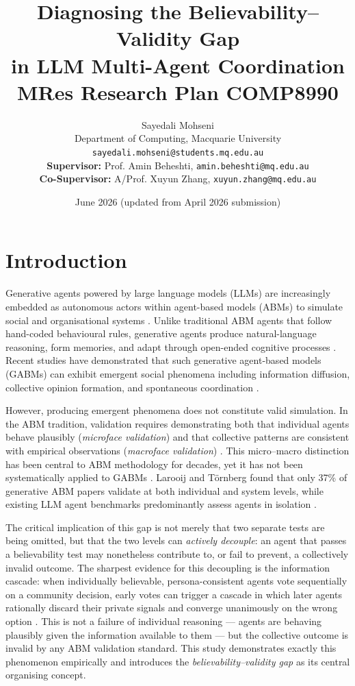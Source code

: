 \documentclass[11pt]{article}
\title{
    Diagnosing the Believability--Validity Gap\\
    in LLM Multi-Agent Coordination\\[0.8em]
    \large MRes Research Plan COMP8990
}
\author{
    Sayedali Mohseni \\
    Department of Computing, Macquarie University \\
    \texttt{sayedali.mohseni@students.mq.edu.au} \\[0.5em]
    \textbf{Supervisor:} Prof. Amin Beheshti, \texttt{amin.beheshti@mq.edu.au} \\
    \textbf{Co-Supervisor:} A/Prof. Xuyun Zhang, \texttt{xuyun.zhang@mq.edu.au}
}
\date{June 2026 (updated from April 2026 submission)}
\begin{document}
\maketitle

\section{Introduction}

Generative agents powered by large language models (LLMs) are increasingly embedded as autonomous actors within agent-based models (ABMs) to simulate social and organisational systems \cite{gao2024survey, ma2024computational}. Unlike traditional ABM agents that follow hand-coded behavioural rules, generative agents produce natural-language reasoning, form memories, and adapt through open-ended cognitive processes \cite{park2023generative}. Recent studies have demonstrated that such generative agent-based models (GABMs) can exhibit emergent social phenomena including information diffusion, collective opinion formation, and spontaneous coordination \cite{park2023generative, ghaffarzadegan2024tutorial}.

However, producing emergent phenomena does not constitute valid simulation. In the ABM tradition, validation requires demonstrating both that individual agents behave plausibly (\emph{microface validation}) and that collective patterns are consistent with empirical observations (\emph{macroface validation}) \cite{windrum2007empirical, moss2005towards}. This micro--macro distinction has been central to ABM methodology for decades, yet it has not been systematically applied to GABMs \cite{sen2025validating, larooij2025critical}. Larooij and T\"{o}rnberg \cite{larooij2025critical} found that only 37\% of generative ABM papers validate at both individual and system levels, while existing LLM agent benchmarks predominantly assess agents in isolation \cite{li2024agentbench, mohammadi2025evaluation}.

The critical implication of this gap is not merely that two separate tests are being omitted, but that the two levels can \emph{actively decouple}: an agent that passes a believability test may nonetheless contribute to, or fail to prevent, a collectively invalid outcome. The sharpest evidence for this decoupling is the information cascade: when individually believable, persona-consistent agents vote sequentially on a community decision, early votes can trigger a cascade in which later agents rationally discard their private signals and converge unanimously on the wrong option \cite{bikhchandani1992theory}. This is not a failure of individual reasoning --- agents are behaving plausibly given the information available to them --- but the collective outcome is invalid by any ABM validation standard. This study demonstrates exactly this phenomenon empirically and introduces the \emph{believability--validity gap} as its central organising concept.
\end{document}
